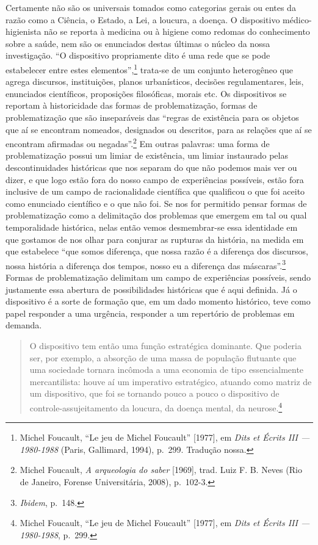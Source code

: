 Certamente não são os universais tomados como categorias gerais ou entes
da razão como a Ciência, o Estado, a Lei, a loucura, a doença. O
dispositivo médico-higienista não se reporta à medicina ou à higiene
como redomas do conhecimento sobre a saúde, nem são os enunciados destas
últimas o núcleo da nossa investigação. ``O dispositivo propriamente
dito é uma rede que se pode estabelecer entre estes
elementos'',\footnote{Michel Foucault, ``Le jeu de Michel Foucault''
  {[}1977{]}, em \textit{Dits et Écrits III --- 1980-1988} (Paris,
  Gallimard, 1994), p.~299. Tradução nossa.} trata-se de um conjunto
heterogêneo que agrega discursos, instituições, planos urbanísticos,
decisões regulamentares, leis, enunciados científicos, proposições
filosóficas, morais etc. Os dispositivos se reportam à historicidade das
formas de problematização, formas de problematização que são
inseparáveis das ``regras de existência para os objetos que aí se
encontram nomeados, designados ou descritos, para as relações que aí se
encontram afirmadas ou negadas''.\footnote{Michel Foucault, \textit{A
  arqueologia do saber} {[}1969{]}, trad. Luiz F. B. Neves (Rio de
  Janeiro, Forense Universitária, 2008), p.~102-3.} Em outras palavras:
uma forma de problematização possui um limiar de existência, um limiar
instaurado pelas descontinuidades históricas que nos separam do que não
podemos mais ver ou dizer, e que logo estão fora do nosso campo de
experiências possíveis, estão fora inclusive de um campo de
racionalidade científica que qualificou o que foi aceito como enunciado
científico e o que não foi. Se nos for permitido pensar formas de
problematização como a delimitação dos problemas que emergem em tal ou
qual temporalidade histórica, nelas então vemos desmembrar-se essa
identidade em que gostamos de nos olhar para conjurar as rupturas da
história, na medida em que estabelece ``que somos diferença, que nossa
razão é a diferença dos discursos, nossa história a diferença dos
tempos, nosso eu a diferença das máscaras''.\footnote{\textit{Ibidem},
  p.~148.} Formas de problematização delimitam um campo de experiências
possíveis, sendo justamente essa abertura de possibilidades históricas
que é aqui definida. Já o dispositivo é a sorte de formação que, em um
dado momento histórico, teve como papel responder a uma urgência,
responder a um repertório de problemas em demanda.

\begin{quote}
O dispositivo tem então uma função estratégica dominante. Que poderia
ser, por exemplo, a absorção de uma massa de população flutuante que uma
sociedade tornara incômoda a uma economia de tipo essencialmente
mercantilista: houve aí um imperativo estratégico, atuando como matriz
de um dispositivo, que foi se tornando pouco a pouco o dispositivo de
controle-assujeitamento da loucura, da doença mental, da
neurose.\footnote{Michel Foucault, ``Le jeu de Michel Foucault''
  {[}1977{]}, em \textit{Dits et Écrits III --- 1980-1988}, p.~299.}
\end{quote}

